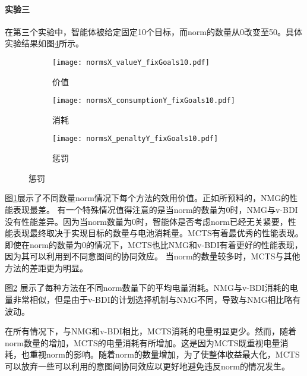\paragraph{实验三}
在第三个实验中，智能体被给定固定10个目标，而norm的数量从0改变至50。具体实验结果如图\ref{fig:all_fixGoals10}所示。

\begin{figure}
\centering
\begin{subfigure}{.47\textwidth}
\centering
\texttt{[image: normsX\_valueY\_fixGoals10.pdf]}
\captionsetup{justification=centering}
\caption{价值}
\label{fig:normsX_valueY_fixGoals10}
\end{subfigure}

\begin{subfigure}{.47\textwidth}
  \centering
  \texttt{[image: normsX\_consumptionY\_fixGoals10.pdf]}
  \captionsetup{justification=centering}
  \caption{消耗}
  \label{fig:normsX_consumptionY_fixGoals10}
\end{subfigure}
\begin{subfigure}{.47\textwidth}
  \centering
  \texttt{[image: normsX\_penaltyY\_fixGoals10.pdf]}
  \captionsetup{justification=centering}
  \caption{惩罚}
  \label{fig:normsX_penaltyY_fixGoals10}
\end{subfigure}
\captionsetup{justification=centering}
\label{fig:all_fixGoals10}
\end{figure}
图\ref{fig:normsX_valueY_fixGoals10}展示了不同数量norm情况下每个方法的效用价值。正如所预料的，NMG的性能表现最差。
有一个特殊情况值得注意的是当norm的数量为0时，NMG与v-BDI没有性能差异。因为当norm数量为0时，智能体是否考虑norm已经无关紧要，性能表现最终取决于实现目标的数量与电池消耗量。MCTS有着最优秀的性能表现。即使在norm的数量为0的情况下，MCTS也比NMG和v-BDI有着更好的性能表现，因为其可以利用到不同意图间的协同效应。
当norm的数量较多时，MCTS与其他方法的差距更为明显。

图\ref{fig:normsX_consumptionY_fixGoals10} 展示了每种方法在不同norm数量下的平均电量消耗。NMG与v-BDI消耗的电量非常相似，但是由于v-BDI的计划选择机制与NMG不同，导致与NMG相比略有波动。

在所有情况下，与NMG和v-BDI相比，MCTS消耗的电量明显更少。然而，随着norm数量的增加，MCTS的电量消耗有所增加。这是因为MCTS既重视电量消耗，也重视norm的影响。随着norm的数量增加，为了使整体收益最大化，MCTS可以放弃一些可以利用的意图间协同效应以更好地避免违反norm的情况发生。

